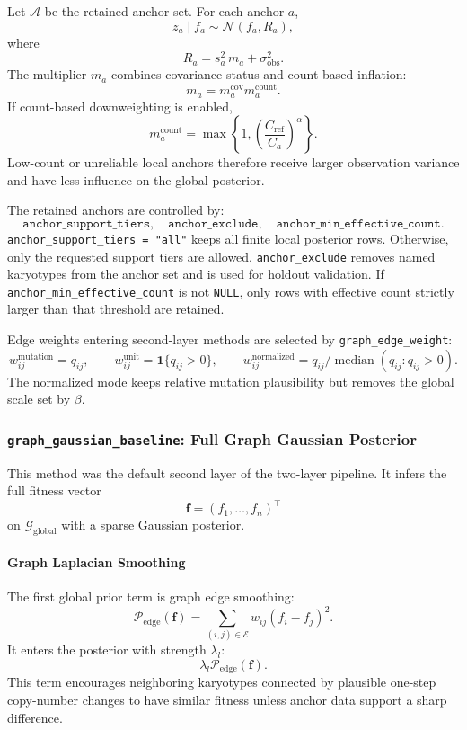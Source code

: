 \documentclass[11pt]{article}
\newcommand{\Normal}{\mathcal{N}}
\begin{document}
Let $\mathcal{A}$ be the retained anchor set. For each anchor $a$,
\[
  z_a\mid f_a
  \sim
  \Normal(f_a,R_a),
\]
where
\[
  R_a = s_a^2\,m_a + \sigma_{\mathrm{obs}}^2.
\]
The multiplier $m_a$ combines covariance-status and count-based inflation:
\[
  m_a
  =
  m^{\mathrm{cov}}_a
  m^{\mathrm{count}}_a.
\]
If count-based downweighting is enabled,
\[
  m^{\mathrm{count}}_a
  =
  \max\left\{
    1,
    \left(\frac{C_{\mathrm{ref}}}{C_a}\right)^\alpha
  \right\}.
\]
Low-count or unreliable local anchors therefore receive larger observation
variance and have less influence on the global posterior.

The retained anchors are controlled by:
\[
  \texttt{anchor\_support\_tiers},\quad
  \texttt{anchor\_exclude},\quad
  \texttt{anchor\_min\_effective\_count}.
\]
\texttt{anchor\_support\_tiers = "all"} keeps all finite local posterior rows.
Otherwise, only the requested support tiers are allowed. \texttt{anchor\_exclude}
removes named karyotypes from the anchor set and is used for holdout
validation. If \texttt{anchor\_min\_effective\_count} is not \texttt{NULL},
only rows with effective count strictly larger than that threshold are retained.

Edge weights entering second-layer methods are selected by
\texttt{graph\_edge\_weight}:
\[
  w_{ij}^{\mathrm{mutation}} = q_{ij},\qquad
  w_{ij}^{\mathrm{unit}} = \mathbf{1}\{q_{ij}>0\},\qquad
  w_{ij}^{\mathrm{normalized}} = q_{ij}/\operatorname{median}(q_{ij}:q_{ij}>0).
\]
The normalized mode keeps relative mutation plausibility but removes the global
scale set by $\beta$.

\subsubsection{\texttt{graph\_gaussian\_baseline}: Full Graph Gaussian Posterior}

This method was the default second layer of the two-layer pipeline. It infers the full fitness vector
\[
  \bm f=(f_1,\ldots,f_n)^\top
\]
on $\mathcal{G}_{\mathrm{global}}$ with a sparse Gaussian posterior.

\paragraph{Graph Laplacian Smoothing}

The first global prior term is graph edge smoothing:
\[
  \mathcal{P}_{\mathrm{edge}}(\bm f)
  =
  \sum_{(i,j)\in\mathcal{E}}
  w_{ij}(f_i-f_j)^2.
\]
It enters the posterior with strength $\lambda_l$:
\[
  \lambda_l\mathcal{P}_{\mathrm{edge}}(\bm f).
\]
This term encourages neighboring karyotypes connected by plausible one-step
copy-number changes to have similar fitness unless anchor data support a sharp
difference.
\end{document}
